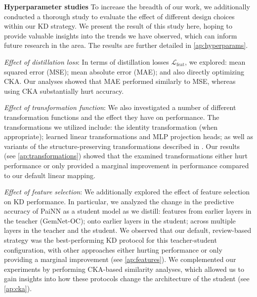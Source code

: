 \documentclass{article}
\newcommand{\loss}{\mathcal{L}}
\begin{document}
\textbf{Hyperparameter studies} 
To increase the breadth of our work, we additionally conducted a thorough study to evaluate the effect of different design choices within our KD strategy. We present the result of this study here, hoping to provide valuable insights into the trends we have observed, which can inform future research in the area. The results are further detailed in \cref{ap:hyperparams}.

\emph{Effect of distillation loss}: In terms of distillation losses $\loss_{\text{feat}}$, we explored: mean squared error (MSE); mean absolute error (MAE); and also directly optimizing CKA. Our analyses showed that MAE performed similarly to MSE, whereas using CKA substantially hurt accuracy.

\emph{Effect of transformation function}: 
We also investigated a number of different transformation functions and the effect they have on performance. The transformations we utilized include: the identity transformation (when appropriate); learned linear transformations and MLP projection heads; as well as variants of the structure-preserving transformations described in \cite{joshi2022}. Our results (see \cref{ap:transformations}) showed that the examined transformations either hurt performance or only provided a marginal improvement in performance compared to our default linear mapping.

\emph{Effect of feature selection}: We additionally explored the effect of feature selection on KD performance. In particular, we analyzed the change in the predictive accuracy of PaiNN as a student model as we distill: features from earlier layers in the teacher (GemNet-OC); onto earlier layers in the student; across multiple layers in the teacher and the student. We observed that our default, review-based strategy was the best-performing KD protocol for this teacher-student configuration, with other approaches either hurting performance or only providing a marginal improvement (see \cref{ap:features}). We complemented our experiments by performing CKA-based similarity analyses, which allowed us to gain insights into how these protocols change the architecture of the student (see \cref{ap:cka}).

\end{document}
